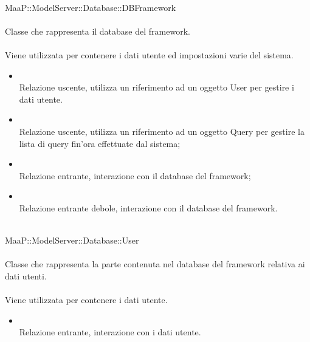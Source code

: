		
	\\
	MaaP::ModelServer::Database::DBFramework\\
	\\
	Classe che rappresenta il database del framework.\\
	\\
	Viene utilizzata per contenere i dati utente ed impostazioni varie del sistema.\\
	\begin{itemize}
	\item{}\\
	Relazione uscente, utilizza un riferimento ad un oggetto User per gestire i dati utente.
	\item{}\\
	Relazione uscente, utilizza un riferimento ad un oggetto Query per gestire la lista di query fin'ora effettuate dal sistema;
	\item{}\\
	Relazione entrante, interazione con il database del framework;
	\item{}\\
	Relazione entrante debole, interazione con il database del framework.
	\end{itemize}
	
	\\
	MaaP::ModelServer::Database::User\\
	\\
	Classe che rappresenta la parte contenuta nel database del framework relativa ai dati utenti.\\
	\\
	Viene utilizzata per contenere i dati utente.\\
	\begin{itemize}
	\item{}\\
	Relazione entrante, interazione con i dati utente.
	\end{itemize}
	

